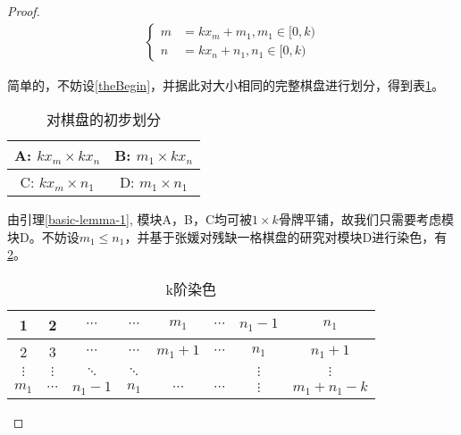 \begin{proof}
    \begin{align}
        \left\{
        \begin{aligned}
            m & =  kx_m + m_1, m_1 \in [0, k) \\
            n & =  kx_n + n_1, n_1 \in [0, k)
        \end{aligned}
        \right.
        \label{theBegin}
    \end{align}

    简单的，不妨设\ref{theBegin}，并据此对大小相同的完整棋盘进行划分，得到表\ref{fig:first-picture}。

    \begin{table}[h]
        \centering
        \caption{对棋盘的初步划分}
        \begin{tabular}{|c|c|}
            \hline
            A: $kx_m \times kx_n$ & B: $m_1 \times kx_n$ \\
            \hline
            C: $kx_m \times n_1$  & D: $m_1 \times n_1$  \\
            \hline
        \end{tabular}
        \label{fig:first-picture}
    \end{table}

    由引理\ref{basic-lemma-1}, 模块A，B，C均可被$1 \times k$骨牌平铺，故我们只需要考虑模块D。不妨设$m_1 \le n_1$，并基于张媛对残缺一格棋盘的研究\cite{zhangOneStain}对模块D进行染色，有\ref{fig:k-order-staining-example}。

    \begin{table}[ht]
        \centering
        \caption{k阶染色}
        \begin{tabular}{|c|c|c|c|c|c|c|c|}
            \hline
            1        & 2        & $\cdots$ & $\cdots$ & $m_1$     & $\cdots$ & $n_1 - 1$ & $n_1$          \\
            \hline
            2        & 3        & $\cdots$ & $\cdots$ & $m_1 + 1$ & $\cdots$ & $n_1$     & $n_1 + 1$      \\
            \hline
            $\vdots$ & $\vdots$ & $\ddots$ & $\ddots$ &           &          & $\vdots$  & $\vdots$       \\
            \hline
            $m_1$    & $\cdots$ & $n_1-1$  & $n_1$    & $\cdots$  & $\cdots$ & $\vdots$  & $m_1 + n_1 -k$ \\
            \hline
        \end{tabular}
        \label{fig:k-order-staining-example}
    \end{table}



\end{proof}
